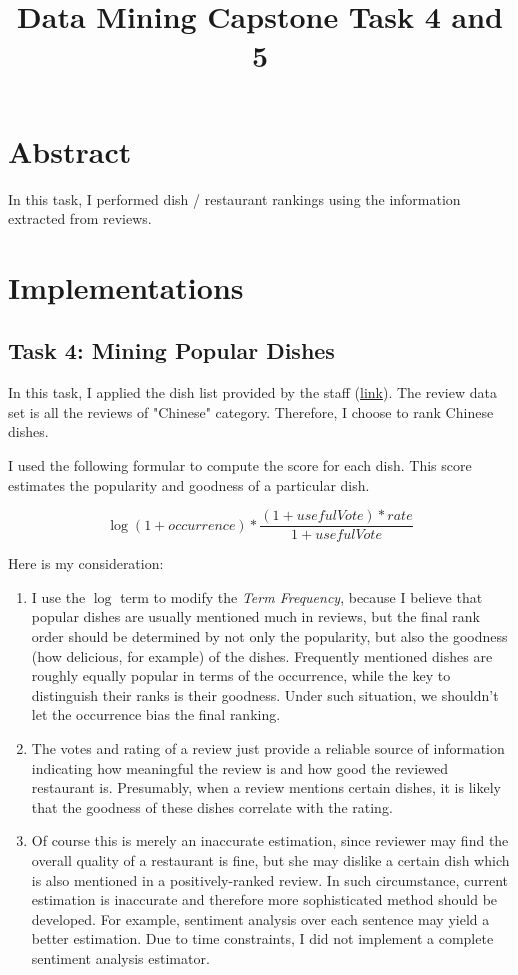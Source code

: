 \documentclass[11pt]{article}
\title{Data Mining Capstone Task 4 and 5}
\begin{document}
\maketitle

\section{Abstract}
In this task, I performed dish / restaurant rankings using the information extracted from reviews.

\section{Implementations}
\subsection{Task 4: Mining Popular Dishes}
In this task, I applied the dish list provided by the staff (\href{https://d28rh4a8wq0iu5.cloudfront.net/dataminingcapstone/Tasks4and5/student_dn_annotations.txt?response-content-type=application%2Foctet-stream&a=1&response-content-disposition=attachment}{link}).
The review data set is all the reviews of "Chinese" category.
Therefore, I choose to rank Chinese dishes.

I used the following formular to compute the score for each dish. This score estimates the popularity and goodness of a particular dish.

$$\log(1 + occurrence) * \frac{(1 + usefulVote) * rate}{1 + usefulVote}$$

Here is my consideration:
\begin{enumerate}
  \item I use the $\log$ term to modify the \emph{Term Frequency}, because I believe that popular dishes are usually mentioned much in reviews, but the final rank order should be determined by not only the popularity, but also the goodness (how delicious, for example) of the dishes.
    Frequently mentioned dishes are roughly equally popular in terms of the occurrence, while the key to distinguish their ranks is their goodness.
    Under such situation, we shouldn't let the occurrence bias the final ranking.
  \item The votes and rating of a review just provide a reliable source of information indicating how meaningful the review is and how good the reviewed restaurant is.
    Presumably, when a review mentions certain dishes, it is likely that the goodness of these dishes correlate with the rating. 
  \item Of course this is merely an inaccurate estimation, since reviewer may find the overall quality of a restaurant is fine, but she may dislike a certain dish which is also mentioned in a positively-ranked review. In such circumstance, current estimation is inaccurate and therefore more sophisticated method should be developed. For example, sentiment analysis over each sentence may yield a better estimation.
    Due to time constraints, I did not implement a complete sentiment analysis estimator.
\end{enumerate}
\end{document}
